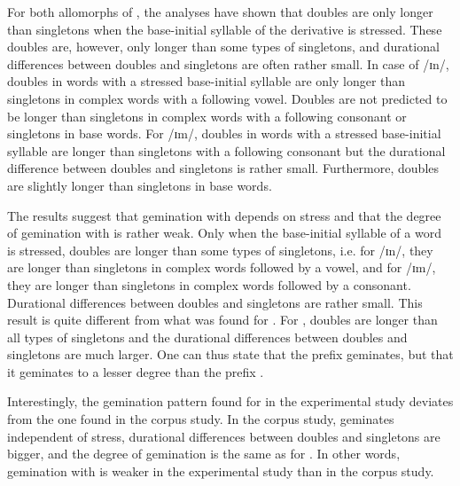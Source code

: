 For both allomorphs of , the analyses have shown that doubles are only longer than singletons when the base-initial syllable of the derivative is stressed. These doubles are, however, only longer than some types of singletons, and durational differences between doubles and singletons are often rather small. 
In case of /ɪn/, doubles in words with a stressed base-initial syllable are only longer than singletons in complex words with a following vowel. Doubles are not predicted to be longer than singletons in complex words with a following consonant or singletons in base words. 
For /ɪm/, doubles in words with a stressed base-initial syllable are longer than singletons with a following consonant but the durational difference between doubles and singletons is rather small.
Furthermore, doubles are slightly longer than singletons in base words.


The results suggest that gemination with  depends on stress and that the degree of gemination with  is rather weak. Only when the base-initial syllable of a word is stressed, doubles are longer than some types of singletons, i.e. for /ɪn/, they are longer than singletons in complex words followed by a vowel, and for /ɪm/, they are longer than singletons in complex words followed by a consonant. Durational differences between doubles and singletons are rather small. This result is quite different from what was found for . For , doubles are longer than all types of singletons and the durational differences between doubles and singletons are much larger. One can thus state that the prefix  geminates, but that it geminates to a lesser degree than the prefix .

Interestingly, the gemination pattern found for  in the experimental study deviates from the one found in the corpus study. In the corpus study,  geminates independent of stress, durational differences between doubles and singletons are bigger, and the degree of gemination is the same as for . In other words, gemination with  is weaker in the experimental study than in the corpus study.

